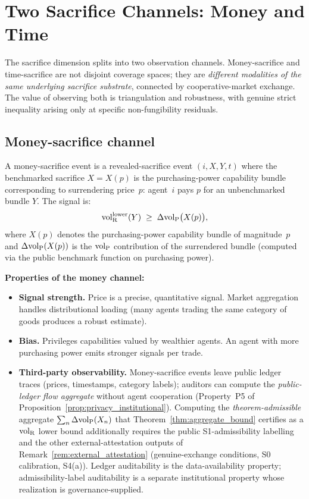 \section{Two Sacrifice Channels: Money and Time}
\label{sec:two_channels}

The sacrifice dimension splits into two observation channels.
Money-sacrifice and time-sacrifice are not disjoint coverage
spaces; they are \emph{different modalities of the same
underlying sacrifice substrate}, connected by cooperative-market
exchange.  The value of observing both is triangulation and
robustness, with genuine strict inequality arising only at
specific non-fungibility residuals.

\subsection{Money-sacrifice channel}

\begin{definition}
\label{def:money_sacrifice}
A money-sacrifice event is a revealed-sacrifice event
$(i, X, Y, t)$ where the benchmarked sacrifice $X = X(p)$ is the
purchasing-power capability bundle corresponding to surrendering
price~$p$: agent~$i$ pays $p$ for an unbenchmarked bundle $Y$.
The signal is:
\[
  {\operatorname{vol}_{\mathrm{R}}^{\mathrm{lower}}}(Y) \;\geq\; \Delta{\operatorname{vol}_{\mathrm{P}}}\bigl(X(p)\bigr),
\]
where $X(p)$ denotes the purchasing-power capability bundle of
magnitude~$p$ and $\Delta{\operatorname{vol}_{\mathrm{P}}}(X(p))$ is the ${\operatorname{vol}_{\mathrm{P}}}$ contribution
of the surrendered bundle (computed via the public benchmark
function on purchasing power).
\end{definition}

\noindent\textbf{Properties of the money channel:}
\begin{itemize}
\item \textbf{Signal strength.}  Price is a precise, quantitative
  signal.  Market aggregation handles distributional loading (many
  agents trading the same category of goods produces a robust
  estimate).
\item \textbf{Bias.}  Privileges capabilities valued by wealthier
  agents.  An agent with more purchasing power emits stronger
  signals per trade.
\item \textbf{Third-party observability.}  Money-sacrifice events
  leave public ledger traces (prices, timestamps, category
  labels); auditors can compute the
  \emph{public-ledger flow aggregate} without agent cooperation
  (Property~P5 of
  Proposition~\ref{prop:privacy_institutional}).  Computing
  the \emph{theorem-admissible} aggregate
  $\sum_n \Delta{\operatorname{vol}_{\mathrm{P}}}(X_n)$ that
  Theorem~\ref{thm:aggregate_bound} certifies as a ${\operatorname{vol}_{\mathrm{R}}}$
  lower bound additionally requires the public
  S1-admissibility labelling and the other
  external-attestation outputs of
  Remark~\ref{rem:external_attestation} (genuine-exchange
  conditions, S0 calibration, S4(a)).  Ledger auditability is
  the data-availability property; admissibility-label
  auditability is a separate institutional property whose
  realization is governance-supplied.
\end{itemize}

